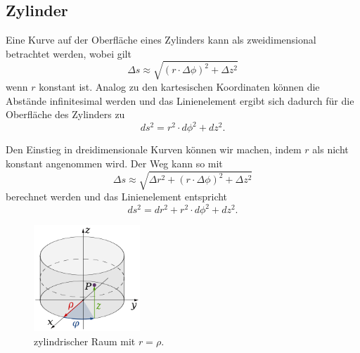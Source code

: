 %
%
%
%
\subsection{Zylinder\label{geodaeten:section:Linienelemente:Zylinder}}

Eine Kurve auf der Oberfläche eines Zylinders kann als zweidimensional betrachtet werden, wobei gilt
\begin{equation}
	\Delta s \approx \sqrt{(r \cdot \Delta \phi)^2 + \Delta z^2}
\end{equation}
wenn $r$ konstant ist.
Analog zu den kartesischen Koordinaten können die Abstände infinitesimal werden und das Linienelement ergibt sich dadurch für die Oberfläche des Zylinders zu
\begin{equation}
	ds^2 = r^2 \cdot d \phi^2 + d z^2 .
	\label{geodaeten:equation:Linienelemente:Zylinder:equation2}
\end{equation}

Den Einstieg in dreidimensionale Kurven können wir machen, indem $r$ als nicht konstant angenommen wird.
Der Weg kann so mit
\begin{equation}
	\Delta s \approx \sqrt{\Delta r^2 + (r \cdot \Delta \phi)^2 + \Delta z^2} %
\end{equation}
berechnet werden und das Linienelement entspricht 
\begin{equation}
	ds^2 = d r^2 + r^2 \cdot d \phi^2 + d z^2 .
	\label{geodaeten:equation:Linienelemente:Zylinder:Zylinder3D}
\end{equation}

\begin{figure}
	\centering
	\includegraphics[width=4cm]{papers/geodaeten/Abbildungen/Linienelemente/LinZyl1}
	\caption{zylindrischer Raum mit $r = \rho$. \cite{geodaeten:polarkoordinaten}}
	\label{geodaeten:figure:Linienelemente:Zylinder:figure2}
	
\end{figure}